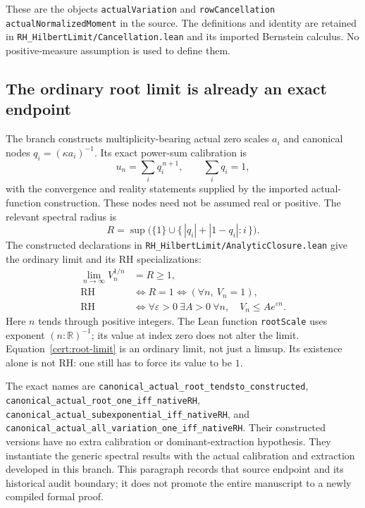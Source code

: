 \documentclass[11pt,a4paper]{article}
\numberwithin{equation}{section}
\theoremstyle{definition}
\theoremstyle{remark}
\newcommand{\R}{\mathbb R}
\newcommand{\RH}{\mathrm{RH}}
\begin{document}
These are the objects \texttt{actualVariation} and
\texttt{rowCancellation actualNormalizedMoment} in the source. The
definitions and identity are retained in \nolinkurl{RH_HilbertLimit/Cancellation.lean}
and its imported Bernstein calculus. No positive-measure assumption is
used to define them.

\subsection{The ordinary root limit is already an exact endpoint}

The branch constructs multiplicity-bearing actual zero scales $a_i$ and
canonical nodes $q_i=(\kappa a_i)^{-1}$. Its exact power-sum calibration is
\begin{equation}\label{cert:power-sums}
u_n=\sum_i q_i^{\,n+1},\qquad \sum_iq_i=1,
\end{equation}
with the convergence and reality statements supplied by the imported
actual-function construction. These nodes need not be assumed real or
positive. The relevant spectral radius is
\begin{equation}\label{cert:radius}
R=\sup\bigl(\{1\}\cup\{\,|q_i|+|1-q_i|:i\,\}\bigr).
\end{equation}
The constructed declarations in \nolinkurl{RH_HilbertLimit/AnalyticClosure.lean}
give the ordinary limit and its RH specializations:
\begin{align}
\lim_{n\to\infty}V_n^{1/n}&=R\ge1,\label{cert:root-limit}\\
\RH&\Longleftrightarrow R=1
\Longleftrightarrow (\forall n,\ V_n=1),\label{cert:root-rh}\\
\RH&\Longleftrightarrow
\forall\varepsilon>0\ \exists A>0\ \forall n,\quad
V_n\le A e^{\varepsilon n}.\label{cert:subexp}
\end{align}
Here $n$ tends through positive integers. The Lean function
\texttt{rootScale} uses exponent $(n:\R)^{-1}$; its value at index zero
does not alter the limit. Equation~\eqref{cert:root-limit} is an ordinary
limit, not just a limsup. Its existence alone is not RH: one still has to
force its value to be $1$.

The exact names are
\nolinkurl{canonical_actual_root_tendsto_constructed},
\nolinkurl{canonical_actual_root_one_iff_nativeRH},
\nolinkurl{canonical_actual_subexponential_iff_nativeRH}, and
\nolinkurl{canonical_actual_all_variation_one_iff_nativeRH}.
Their constructed versions have no extra calibration or dominant-extraction
hypothesis. They instantiate the generic spectral results with the actual
calibration and extraction developed in this branch. This paragraph records
that source endpoint and its historical audit boundary; it does not promote
the entire manuscript to a newly compiled formal proof.
\end{document}
